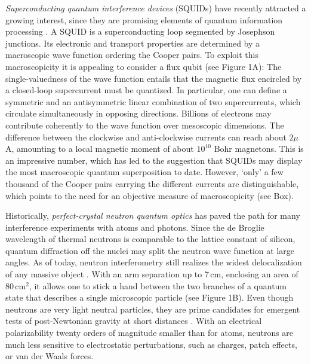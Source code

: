 \documentclass[11pt]{article}
\begin{document}
\emph{Superconducting quantum interference devices }(SQUIDs) have recently attracted a growing interest, since they are promising
elements of quantum information processing \cite{Devoret2013}. A SQUID is a superconducting loop segmented by Josephson junctions.
Its electronic and transport properties are determined by 
a macroscopic wave function
ordering the Cooper pairs.
To exploit this 
macroscopicity it is appealing to consider a flux qubit\cite{Clarke2008} (see Figure 1A):
The single-valuedness of the wave function entails that the magnetic flux encircled by a closed-loop supercurrent must be quantized.
In particular, one can  define a symmetric and an antisymmetric linear combination of two supercurrents, which 
circulate simultaneously in opposing directions.
Billions of electrons may contribute coherently to the wave function over mesoscopic dimensions.
The difference between the clockwise and anti-clockwise currents\cite{Friedman2000_long} can reach about $2\mu$A,
amounting to a  local magnetic moment of about $10^{10}$
Bohr magnetons.
This is an impressive number, which has led to the suggestion that SQUIDs may display the most macroscopic quantum superposition to date.
However, `only' a few thousand of the Cooper pairs carrying the different currents are distinguishable\cite{Korsbakken2010}, which points to the need for an objective measure of macroscopicity (see Box).

Historically, \emph{perfect-crystal neutron quantum optics} \cite{Rauch1974} has paved the path for many interference experiments with atoms and photons.
Since the de Broglie wavelength of thermal neutrons is comparable
to the lattice constant of silicon, quantum diffraction off the nuclei may split the neutron wave function at large angles.
As of today, neutron interferometry still realizes the widest delocalization
of any massive object \cite{Zawisky2002}. With an arm separation up to 7\,cm, enclosing an area of 80\,cm$^2$,
it allows one to stick a hand between 
the two branches of a quantum state that describes a single microscopic particle (see Figure 1B).
Even though neutrons are very light neutral particles,
they are prime candidates for emergent tests of post-Newtonian gravity at short distances \cite{Nesvizhevsky2002,Jenke2011}.
With an electrical polarizability twenty orders of magnitude smaller than for atoms, neutrons are much less sensitive to electrostatic perturbations, such as charges, patch effects, or van der Waals forces.
\end{document}
